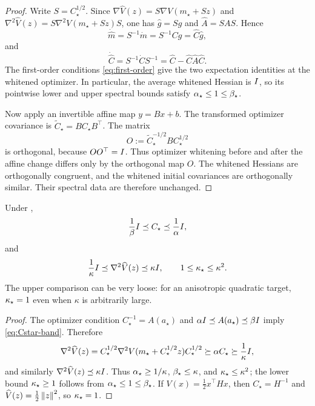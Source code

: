 \begin{proof}
Write $S=C_\star^{1/2}$.  Since
$\nabla\widehat V(z)=S\nabla V(m_\star+Sz)$ and
$\nabla^2\widehat V(z)=S\nabla^2V(m_\star+Sz)S$, one has
$\widehat g=Sg$ and $\widehat A=SAS$.  Hence
\[
    \dot{\widehat m}
    =S^{-1}\dot m
    =S^{-1}Cg
    =\widehat C\widehat g,
\]
and
\[
    \dot{\widehat C}
    =S^{-1}\dot CS^{-1}
    =\widehat C-\widehat C\widehat A\widehat C.
\]
The first-order conditions \eqref{eq:first-order} give the two expectation identities at the
whitened optimizer.  In particular, the average whitened Hessian is $I$, so its pointwise lower
and upper spectral bounds satisfy $\alpha_\star\leq1\leq\beta_\star$.

Now apply an invertible affine map $y=Bx+b$.  The transformed optimizer covariance is
$\widetilde C_\star=BC_\star B^\top$.  The matrix
\[
    O:=\widetilde C_\star^{-1/2}BC_\star^{1/2}
\]
is orthogonal, because $OO^\top=I$.  Thus optimizer whitening before and after the affine
change differs only by the orthogonal map $O$.  The whitened Hessians are orthogonally congruent,
and the whitened initial covariances are orthogonally similar.  Their spectral data are therefore
unchanged.
\end{proof}

\begin{lemma}
\label{lem:kappa-star-kappa}
Under ,
\begin{equation}
\label{eq:Cstar-band}
    \frac1\beta I\preceq C_\star\preceq\frac1\alpha I,
\end{equation}
and
\begin{equation}
\label{eq:kappa-star-kappa}
    \frac1\kappa I\preceq\nabla^2\widehat V(z)\preceq\kappa I,
    \qquad
    1\leq\kappa_\star\leq\kappa^2.
\end{equation}
The upper comparison can be very loose: for an anisotropic quadratic target, $\kappa_\star=1$ even
when $\kappa$ is arbitrarily large.
\end{lemma}

\begin{proof}
The optimizer condition $C_\star^{-1}=A(a_\star)$ and
$\alpha I\preceq A(a_\star)\preceq\beta I$ imply \eqref{eq:Cstar-band}.  Therefore
\[
    \nabla^2\widehat V(z)
    =C_\star^{1/2}\nabla^2V(m_\star+C_\star^{1/2}z)C_\star^{1/2}
    \succeq\alpha C_\star\succeq\frac1\kappa I,
\]
and similarly $\nabla^2\widehat V(z)\preceq\kappa I$.  Thus
$\alpha_\star\geq1/\kappa$, $\beta_\star\leq\kappa$, and
$\kappa_\star\leq\kappa^2$; the lower bound $\kappa_\star\geq1$ follows from
$\alpha_\star\leq1\leq\beta_\star$.  If $V(x)=\tfrac12x^\top Hx$, then
$C_\star=H^{-1}$ and $\widehat V(z)=\tfrac12\left\lVert z\right\rVert^2$, so $\kappa_\star=1$.
\end{proof}


